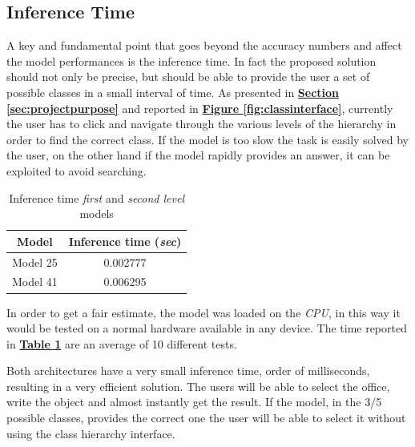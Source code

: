 \documentclass[12pt]{article}
\begin{document}
\subsection{Inference Time}
A key and fundamental point that goes beyond the accuracy numbers and affect the model performances is the inference time. In fact the proposed solution should not only be precise, but should be able to provide the user a set of possible classes in a small interval of time. As presented in  \hyperref[sec:projectpurpose]{\textbf{Section \ref{sec:projectpurpose}}} and reported in \hyperref[fig:classinterface]{\textbf{Figure \ref{fig:classinterface}}}, currently the user has to click and navigate through the various levels of the hierarchy in order to find the correct class. If the model is too slow the task is easily solved by the user, on the other hand if the model rapidly provides an answer, it can be exploited to avoid searching.

\begin{table}[ht!]
    \begin{adjustwidth}{}{}
	    \centering
	    \small
	    \begin{tabular}{ |c|c| }
        \hline
        \textbf{Model} & \textbf{Inference time (\textit{sec})} \\
        \hline
        Model 25 & 0.002777 \\
        Model 41 & 0.006295 \\
        \hline
        \end{tabular}
    \end{adjustwidth}
    \captionsetup{justification   = centering}
    \caption{Inference time \textit{first} and \textit{second level} models}
    \label{tb:inf-time}
\end{table}

In order to get a fair estimate, the model was loaded on the \textit{CPU}, in this way it would be tested on a normal hardware available in any device. The time reported in \hyperref[tb:inf-time]{\textbf{Table \ref{tb:inf-time}}} are an average of 10 different tests.

Both architectures have a very small inference time, order of milliseconds, resulting in a very efficient solution. The users will be able to select the office, write the object and almost instantly get the result. If the model, in the 3/5 possible classes, provides the correct one the user will be able to select it without using the class hierarchy interface.
\end{document}
